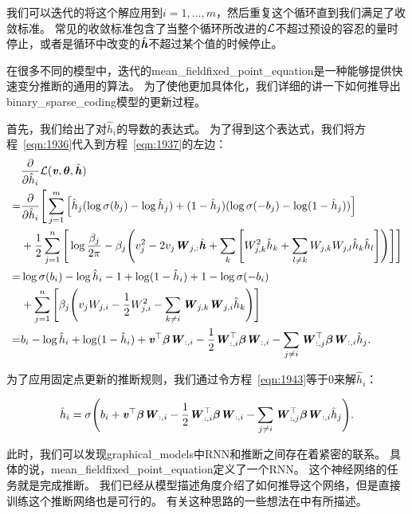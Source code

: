 我们可以迭代的将这个解应用到$i = 1,\ldots,m$，然后重复这个循环直到我们满足了收敛标准。
常见的收敛标准包含了当整个循环所改进的$\mathcal{L}$不超过预设的容忍的量时停止，或者是循环中改变的$\hat{\boldsymbol{\mathit{h}}}$不超过某个值的时候停止。

在很多不同的模型中，迭代的\gls{mean_field}\gls{fixed_point_equation}是一种能够提供快速变分推断的通用的算法。
为了使他更加具体化，我们详细的讲一下如何推导出\gls{binary_sparse_coding}模型的更新过程。


首先，我们给出了对$\hat{h}_i$的导数的表达式。
为了得到这个表达式，我们将方程~\eqref{eqn:1936}代入到方程~\eqref{eqn:1937}的左边：
\begin{align}
\label{eqn:1943}
& \frac{\partial}{\partial \hat{h}_i} \mathcal{L} (\boldsymbol{\mathit{v}},\boldsymbol{\theta},\hat{\boldsymbol{\mathit{h}}})    \\
= & \frac{\partial}{\partial \hat{h}_i} \Bigg[\sum_{j=1}^{m}\Big[\hat{h}_j (\log \sigma(b_j) - \log \hat{h}_j) + (1 - \hat{h}_j)(\log \sigma(-b_j) - \log (1-\hat{h}_j))\Big] \\
& + \frac{1}{2} \sum_{j=1}^{n} \Bigg[ \log {\frac{\beta_j}{2\pi}} - \beta_j \Bigg(v_j^2 - 2 v_j \boldsymbol{\mathit{W}}_{j,:}\hat{\boldsymbol{\mathit{h}}} + \sum_{k}\Bigg[W^2_{j,k}\hat{h}_k + \sum_{l \neq k}W_{j,k}W_{j,l}\hat{h}_k\hat{h}_l \Bigg] \Bigg) \Bigg]\Bigg] \\
= & \log \sigma(b_i) - \log \hat{h}_i - 1 + \log (1 - \hat{h}_i ) + 1 - \log \sigma (- b_i ) \\
 & + \sum_{j=1}^{n} \Bigg[\beta_j \Bigg(v_j W_{j,i} - \frac{1}{2} W_{j,i}^2 - \sum_{k \neq i} \boldsymbol{\mathit{W}}_{j,k}\boldsymbol{\mathit{W}}_{j,i} \hat{h}_k\Bigg) \Bigg]\\
 = & b_i - \log \hat{h}_i + \log (1 - \hat{h}_i ) + \boldsymbol{\mathit{v}}^{\top} {\boldsymbol{\beta}} \boldsymbol{\mathit{W}}_{:,i} - \frac{1}{2} \boldsymbol{\mathit{W}}_{:,i}^{\top} {\boldsymbol{\beta}}\boldsymbol{\mathit{W}}_{:,i} -\sum_{j\neq i}\boldsymbol{\mathit{W}}^{\top}_{:,j}{\boldsymbol{\beta}}\boldsymbol{\mathit{W}}_{:,i}\hat{h}_j.
\end{align}

为了应用固定点更新的推断规则，我们通过令方程~\eqref{eqn:1943}等于$0$来解$\hat{h}_i$：

\begin{align}
\label{eqn:1944}
\hat{h}_i = \sigma\Bigg(b_i + \boldsymbol{\mathit{v}}^{\top} {\boldsymbol{\beta}} \boldsymbol{\mathit{W}}_{:,i} - \frac{1}{2} \boldsymbol{\mathit{W}}_{:,i}^{\top} {\boldsymbol{\beta}} \boldsymbol{\mathit{W}}_{:,i} - \sum_{j \neq i }  \boldsymbol{\mathit{W}}_{:,j}^{\top} {\boldsymbol{\beta}}  \boldsymbol{\mathit{W}}_{:,i} \hat{h}_j \Bigg).
\end{align}

此时，我们可以发现\gls{graphical_models}中\gls{RNN}和推断之间存在着紧密的联系。
具体的说，\gls{mean_field}\gls{fixed_point_equation}定义了一个\gls{RNN}。
这个神经网络的任务就是完成推断。
我们已经从模型描述角度介绍了如何推导这个网络，但是直接训练这个推断网络也是可行的。
有关这种思路的一些想法在中有所描述。

